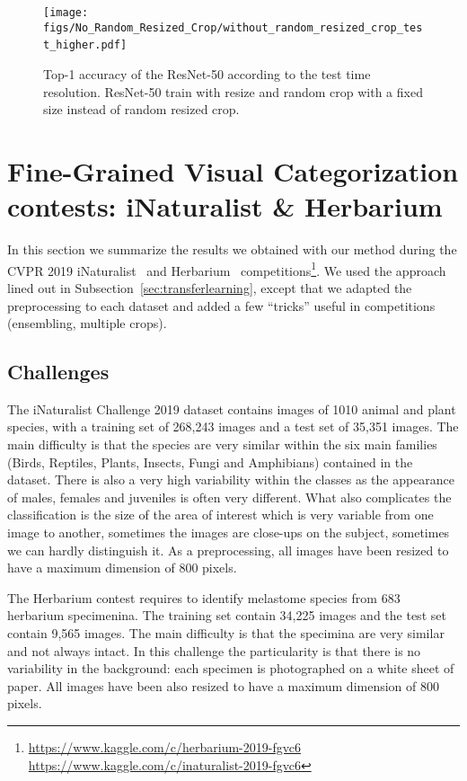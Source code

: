 \begin{figure}[t]
\begin{center}
\texttt{[image: figs/No\_Random\_Resized\_Crop/without\_random\_resized\_crop\_test\_higher.pdf]}~\end{center}
\caption{\label{fig:norandomresizedcrop}
Top-1 accuracy of the ResNet-50 according to the test time resolution. ResNet-50 train with resize and random crop with a fixed size instead of random resized crop.
}
\end{figure}

\section{Fine-Grained Visual Categorization contests: iNaturalist \& Herbarium}
\label{sec:challenges}

In this section we summarize the results we obtained with our method during the CVPR 2019 iNaturalist~\cite{Horn2017INaturalist} and Herbarium~\cite{Kiat2019Herbarium} competitions\footnote{
\url{https://www.kaggle.com/c/herbarium-2019-fgvc6} \newline
\url{https://www.kaggle.com/c/inaturalist-2019-fgvc6}}.
We used the approach lined out in Subsection~\ref{sec:transferlearning}, except that we adapted the preprocessing to each dataset and added a few ``tricks'' useful in competitions (ensembling, multiple crops). 

\subsection{Challenges}

The iNaturalist Challenge 2019 dataset contains images of 1010 animal and plant species, with a training set of 268,243 images and a test set of 35,351 images. 
The main difficulty is that the species are very similar within the six main families (Birds, Reptiles, Plants, Insects, Fungi and Amphibians) contained in the dataset. 
There is also a very high variability within the classes as the appearance of males, females and juveniles is often very different.
What also complicates the classification is the size of the area of interest which is very variable from one image to another, sometimes the images are close-ups on the subject, sometimes we can hardly distinguish it. 
As a preprocessing, all images have been resized to have a maximum dimension of 800 pixels.

The Herbarium contest requires to identify melastome species from 683 herbarium specimenina.
The training set contain 34,225 images and the test set contain 9,565 images. 
The main difficulty is that the specimina are very similar and not always intact. 
In this challenge the particularity is that there is no variability in the background: each specimen is photographed on a white sheet of paper. All images have been also resized to have a maximum dimension of 800 pixels.


